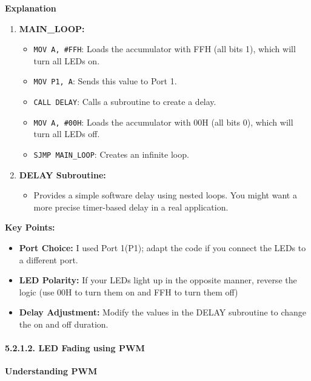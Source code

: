 \documentclass[
]{article}
\begin{document}
\textbf{Explanation}

\begin{enumerate}
\def\labelenumi{\arabic{enumi}.}
\item
  \textbf{MAIN\_LOOP:}

  \begin{itemize}
  \item
    \texttt{MOV\ A,\ \#FFH}: Loads the accumulator with FFH (all bits
    1), which will turn all LEDs on.
  \item
    \texttt{MOV\ P1,\ A}: Sends this value to Port 1.
  \item
    \texttt{CALL\ DELAY}: Calls a subroutine to create a delay.
  \item
    \texttt{MOV\ A,\ \#00H}: Loads the accumulator with 00H (all bits
    0), which will turn all LEDs off.
  \item
    \texttt{SJMP\ MAIN\_LOOP}: Creates an infinite loop.
  \end{itemize}
\item
  \textbf{DELAY Subroutine:}

  \begin{itemize}
  \item
    Provides a simple software delay using nested loops. You might want
    a more precise timer-based delay in a real application.
  \end{itemize}
\end{enumerate}

\textbf{Key Points:}

\begin{itemize}
\item
  \textbf{Port Choice:} I used Port 1(P1); adapt the code if you connect
  the LEDs to a different port.
\item
  \textbf{LED Polarity:} If your LEDs light up in the opposite manner,
  reverse the logic (use 00H to turn them on and FFH to turn them off)
\item
  \textbf{Delay Adjustment:} Modify the values in the DELAY subroutine
  to change the on and off duration.
\end{itemize}

\hypertarget{5212-led-fading-using-pwm}{%
\paragraph{5.2.1.2. LED Fading using
PWM}\label{5212-led-fading-using-pwm}}

\textbf{Understanding PWM}
\end{document}
